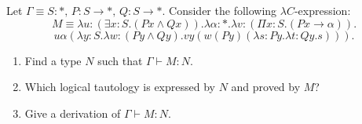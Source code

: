 \begin{problem}{7.14}
    Let $\Gamma \equiv S : *, \, P : S \rightarrow *, \, Q : S \rightarrow *$. Consider the following $\lambda C$-expression:
    $$M \equiv \lambda u : (\exists x : S . (Px \land Qx)) . \lambda \alpha : * . \lambda v : (\Pi x : S . (Px \rightarrow \alpha)) .$$
    $$u \alpha (\lambda y : S . \lambda w : (Py \land Qy) . vy(w(Py)(\lambda s : Py . \lambda t : Qy . s))) .$$
    \begin{enumerate}[label=$(\alph*)$]
    \item Find a type $N$ such that $\Gamma \vdash M : N$.
    \item Which logical tautology is expressed by $N$ and proved by $M$?
    \item Give a derivation of $\Gamma \vdash M : N$.
    \end{enumerate}
\end{problem}